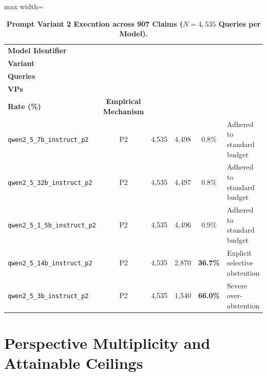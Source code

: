 \documentclass[11pt,a4paper]{article}
\begin{document}
\begin{table}[htbp]
\centering
\small
\caption{\textbf{Prompt Variant 2 Execution across 907 Claims ($N=4,535$ Queries per Model).}}
\label{tab:p2_abstention}
\begin{adjustbox}{max width=\linewidth}
\begin{tabular}{l c c c c p{2.8cm}}
\toprule
\textbf{Model Identifier} & \makecell{\textbf{Prompt}\\\textbf{Variant}} & \makecell{\textbf{Total}\\\textbf{Queries}} & \makecell{\textbf{Valid}\\\textbf{VPs}} & \makecell{\textbf{Abstention}\\\textbf{Rate (\%)}} & \textbf{Empirical Mechanism} \\
\midrule
\texttt{qwen2\_5\_7b\_instruct\_p2} & P2 & 4,535 & 4,498 & $0.8\%$ & Adhered to standard budget \\
\texttt{qwen2\_5\_32b\_instruct\_p2}& P2 & 4,535 & 4,497 & $0.8\%$ & Adhered to standard budget \\
\texttt{qwen2\_5\_1\_5b\_instruct\_p2}& P2 & 4,535 & 4,496 & $0.9\%$ & Adhered to standard budget \\
\texttt{qwen2\_5\_14b\_instruct\_p2}& P2 & 4,535 & 2,870 & \textbf{36.7\%} & Explicit selective abstention \\
\texttt{qwen2\_5\_3b\_instruct\_p2} & P2 & 4,535 & 1,540 & \textbf{66.0\%} & Severe over-abstention \\
\bottomrule
\end{tabular}
\end{adjustbox}
\end{table}

\section{Perspective Multiplicity and Attainable Ceilings}
\label{sec:multiplicity}
\end{document}
